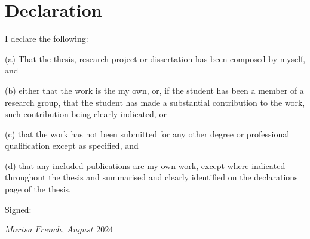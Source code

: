 \section{Declaration}

I declare the following:

(a) That the thesis, research project or dissertation has been composed by myself, and

(b) either that the work is the my own, or, if the student has been a member of a research group, that the student has made a substantial contribution to the work, such contribution being clearly indicated, or

(c) that the work has not been submitted for any other degree or professional qualification except as specified, and

(d) that any included publications are my own work, except where indicated throughout the thesis and summarised and clearly identified on the declarations page of the thesis.

Signed:

$Marisa$ $French$, 
$August$ $2024$